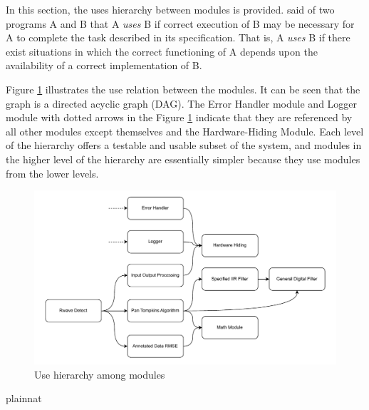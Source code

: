 \documentclass[12pt, titlepage]{article}
\begin{document}
In this section, the uses hierarchy between modules is provided.
\citet{Parnas1978} said of two programs A and B that A {\em uses} B if correct
execution of B may be necessary for A to complete the task described in its
specification. That is, A {\em uses} B if there exist situations in which the
correct functioning of A depends upon the availability of a correct
implementation of B.

Figure \ref{FigUH} illustrates the use relation between the modules. It can be
seen that the graph is a directed acyclic graph (DAG).  The Error Handler module
and Logger module with dotted arrows in the Figure \ref{FigUH} indicate that
they are referenced by all other modules except themselves and the
Hardware-Hiding Module.  Each level of the hierarchy offers a testable and
usable subset of the system, and modules in the higher level of the hierarchy
are essentially simpler because they use modules from the lower levels.


\begin{figure}[H]
\centering
\includegraphics[width=1.1\textwidth]{UsesHierarchy.pdf}
\caption{Use hierarchy among modules}
\label{FigUH}
\end{figure}




 {plainnat}


\newpage{}
\end{document}
